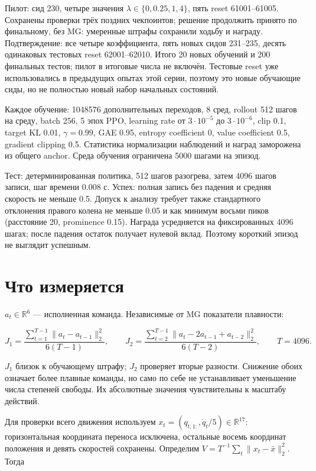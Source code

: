 \documentclass[10pt,a4paper]{article}
\begin{document}
Пилот: сид 230, четыре значения $\lambda\in\{0,0.25,1,4\}$, пять reset 61001--61005. Сохранены проверки трёх поздних чекпоинтов; решение продолжить принято по финальному, без MG: умеренные штрафы сохранили ходьбу и награду. Подтверждение: все четыре коэффициента, пять новых сидов 231--235, десять одинаковых тестовых reset 62001--62010. Итого 20 новых обучений и 200 финальных тестов; пилот в итоговые числа не включён. Тестовые reset уже использовались в предыдущих опытах этой серии, поэтому это новые обучающие сиды, но не полностью новый набор начальных состояний.

Каждое обучение: 1048576 дополнительных переходов, 8 сред, rollout 512 шагов на среду, batch 256, 5 эпох PPO, learning rate от $3\cdot10^{-5}$ до $3\cdot10^{-6}$, clip 0.1, target KL 0.01, $\gamma=0.99$, GAE 0.95, entropy coefficient 0, value coefficient 0.5, gradient clipping 0.5. Статистика нормализации наблюдений и наград заморожена из общего anchor. Среда обучения ограничена 5000 шагами на эпизод.

Тест: детерминированная политика, 512 шагов разогрева, затем 4096 шагов записи, шаг времени 0.008 с. Успех: полная запись без падения и средняя скорость не меньше 0.5. Допуск к анализу требует также стандартного отклонения правого колена не меньше 0.05 и как минимум восьми пиков (расстояние 20, prominence 0.15). Награда усредняется на фиксированных 4096 шагах; после падения остаток получает нулевой вклад. Поэтому короткий эпизод не выглядит успешным.

\section*{Что измеряется}

$a_t\in\mathbb{R}^6$ --- исполненная команда. Независимые от MG показатели плавности:

\[
J_1=\frac{\sum_{t=1}^{T-1}\|a_t-a_{t-1}\|_2^2}{6(T-1)},\qquad
J_2=\frac{\sum_{t=2}^{T-1}\|a_t-2a_{t-1}+a_{t-2}\|_2^2}{6(T-2)},\qquad T=4096.
\]

$J_1$ близок к обучающему штрафу; $J_2$ проверяет вторые разности. Снижение обоих означает более плавные команды, но само по себе не устанавливает уменьшение числа степеней свободы. Их абсолютные значения чувствительны к масштабу действий.

\newpage

Для проверки всего движения используем $x_t=(q_{t,1:},\dot q_t/5)\in\mathbb{R}^{17}$: горизонтальная координата переноса исключена, остальные восемь координат положения и девять скоростей сохранены. Определим $V=T^{-1}\sum_t\|x_t-\bar x\|_2^2$. Тогда
\end{document}
